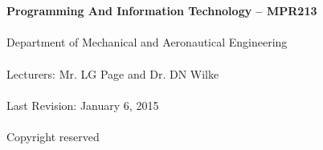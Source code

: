 \begin{titlepage}
    \thispagestyle{empty}
    \\~\\[18cm]
    \large
    \textbf{Programming And Information Technology -- MPR213} \\~\\
    Department of Mechanical and Aeronautical Engineering \\~\\[0.5cm]
    \normalsize
    Lecturers: Mr. LG Page and  Dr. DN Wilke \\~\\
    Last Revision: January 6, 2015 \\~\\[0.5em]
    \textcopyright \quad Copyright reserved \\~\\
\end{titlepage}
\restoregeometry
